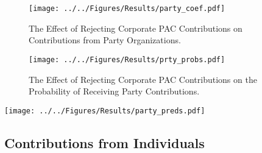\documentclass[12pt]{article}
\begin{document}
\begin{figure*}[h]
    \centering
    \begin{subfigure}[b]{0.75\textwidth}
        \centering
        \texttt{[image: ../../Figures/Results/party\_coef.pdf]}
        \caption{The Effect of Rejecting Corporate PAC Contributions on Contributions from Party Organizations.}
        \label{fig: party coefs}
    \end{subfigure}
    
    \begin{subfigure}[b]{0.75\textwidth}
        \centering
        \texttt{[image: ../../Figures/Results/prty\_probs.pdf]}
        \caption{The Effect of Rejecting Corporate PAC Contributions on the Probability of Receiving Party Contributions.}
        \label{fig: party probs}
    \end{subfigure}
    \caption{\textbf{The Effect of Rejecting Corporate PAC Contributions on Contributions and the Probability of Receiving Money from Political Parties.} These figures present the posterior distributions estimated for a candidate that pledges to reject corporate PAC contributions. The dot shows the median coefficient estimate and the intervals show the 50\% and 89\% highest density intervals. Figure \ref{fig: party coefs} shows that candidates that pledge to reject corporate PAC contributions experience a reduction in contributions from leadership PACs but also experience an increase in contributions from candidate committees. Figure \ref{fig: party probs} shows that rejecting corporate PAC contributions has no effect on the probability of receiving contributions from candidate committees, leadership PACs, or political parties. See Table \ref{tbl: party results} for the formal estimates.}
    \label{fig: party results}
\end{figure*}

\begin{figure*}[h]
	\centering
	\texttt{[image: ../../Figures/Results/party\_preds.pdf]}
\end{figure*}


\subsection{Contributions from Individuals}
\end{document}
